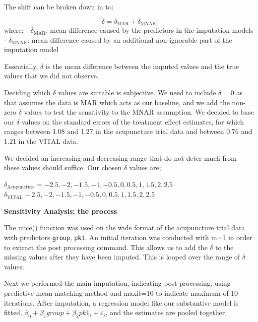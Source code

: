 \documentclass{article}
\begin{document}
The shift can be broken down in to:

\[\delta = \delta_\mathrm{MAR} + \delta_\mathrm{MNAR}\] where; -
\(\delta_\mathrm{MAR}\): mean difference caused by the predictors in the
imputation models - \(\delta_\mathrm{MNAR}\): mean difference caused by
an additional non-ignorable part of the imputation model

Essentially, \(\delta\) is the mean difference between the imputed
values and the true values that we did not observe.

Deciding which \(\delta\) values are suitable is subjective. We need to
include \(\delta=0\) as that assumes the data is MAR which acts as our
baseline, and we add the non-zero \(\delta\) values to test the
sensitivity to the MNAR assumption. We decided to base our \(\delta\)
values on the standard errors of the treatment effect estimates, for
which ranges between 1.08 and 1.27 in the acupuncture trial data and
between 0.76 and 1.21 in the VITAL data.

We decided an increasing and decreasing range that do not deter much
from these values should suffice. Our chosen \(\delta\) values are;

\(\delta_\mathrm{Acupuncture} = -2.5,-2,-1.5,-1,-0.5,0,0.5,1,1.5,2,2.5\)
\(\delta_\mathrm{VITAL} -2.5,-2,-1.5,-1,-0.5,0,0.5,1,1.5,2,2.5\)

\textbf{Sensitivity Analysis; the process}

The mice() function was used on the wide format of the acupuncture trial
data with predictors \texttt{group}, \texttt{pk1}. An initial iteration
was conducted with m=1 in order to extract the post processing command.
This allows us to add the \(\delta\) to the missing values after they
have been imputed. This is looped over the range of \(\delta\) values.

Next we performed the main imputation, indicating post processing, using
predictive mean matching method and maxit=10 to indicate maximum of 10
iterations. After imputation, a regression model like our substantive
model is fitted, \(\beta_0 + \beta_1group+\beta_2pk1_i+\varepsilon_i\),
and the estimates are pooled together. \newpage
\end{document}
